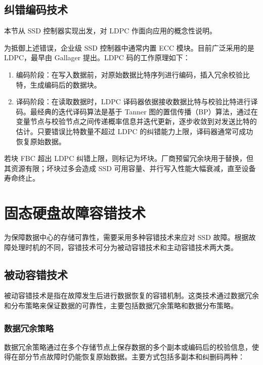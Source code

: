 \subsection{纠错编码技术}

本节从 SSD 控制器实现出发，对 LDPC 作面向应用的概念性说明。

为抵御上述错误，企业级 SSD 控制器中通常内置 ECC 模块。目前广泛采用的是 LDPC，最早由 Gallager 提出\cite{gallager2003low}。LDPC 码的工作原理如下：

\begin{enumerate}
    \item 编码阶段：在写入数据前，对原始数据比特序列进行编码，插入冗余校验比特，生成编码后的数据块。
    
    \item 译码阶段：在读取数据时，LDPC 译码器依据接收数据比特与校验比特进行译码。最经典的迭代译码算法是基于 Tanner 图的置信传播（BP）算法，通过在变量节点与校验节点之间传递概率信息并迭代更新，逐步收敛到对发送比特的估计。只要错误比特数量不超过 LDPC 的纠错能力上限，译码器通常可成功恢复原始数据。
\end{enumerate}

若块 FBC 超出 LDPC 纠错上限，则标记为坏块。厂商预留冗余块用于替换，但其资源有限；坏块过多会造成 SSD 可用容量、并行写入性能大幅衰减，直至设备寿命终止。
\section{固态硬盘故障容错技术}

为保障数据中心的存储可靠性，需要采用多种容错技术来应对 SSD 故障。根据故障处理时机的不同，容错技术可分为被动容错技术和主动容错技术两大类。

\subsection{被动容错技术}

被动容错技术是指在故障发生后进行数据恢复的容错机制。这类技术通过数据冗余和分布策略来保证数据的可靠性，主要包括数据冗余策略和数据分布策略。

\subsubsection{数据冗余策略}

数据冗余策略通过在多个存储节点上保存数据的多个副本或编码后的校验信息，使得在部分节点故障时仍能恢复原始数据。主要方式包括多副本和纠删码两种：

